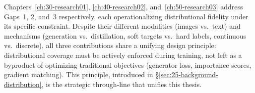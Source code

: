 \begin{foldable}
  Chapters~\ref{ch:30-research01}, \ref{ch:40-research02}, and~\ref{ch:50-research03} address Gaps~1, 2, and~3 respectively, each operationalizing distributional fidelity under its specific constraint.
  Despite their different modalities (images vs.\ text) and mechanisms (generation vs.\ distillation, soft targets vs.\ hard labels, continuous vs.\ discrete), all three contributions share a unifying design principle: distributional coverage must be actively enforced during training, not left as a byproduct of optimizing traditional objectives (generator loss, importance scores, gradient matching).
  This principle, introduced in \S\ref{sec:25-background-distribution}, is the strategic through-line that unifies this thesis.
\end{foldable}
